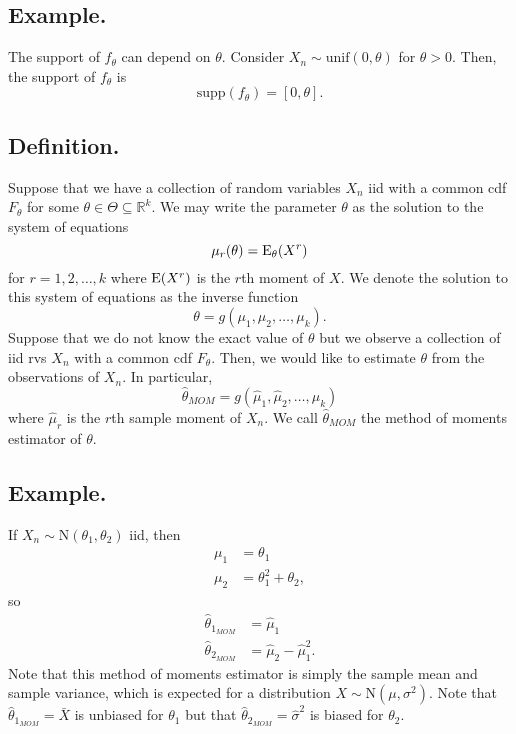 \documentclass[titlepage]{article}
\begin{document}
\subsection{Example.} The support of $f_{\theta}$ can depend on $\theta$. Consider $X_{n} \sim \text{unif}(0, \theta)$ for $\theta > 0$. Then, the support of $f_{\theta}$ is
$$\text{supp}(f_{\theta}) = [0, \theta].$$

\subsection{Definition.} Suppose that we have a collection of random variables $X_{n}$ iid with a common cdf $F_{\theta}$ for some $\theta \in \Theta \subseteq \mathbb{R}^{k}$. We may write the parameter $\theta$ as the solution to the system of equations 
$$\mu_{r}(\theta) = \text{E}_{\theta}(X^{r})$$
for $r = 1, 2, \ldots, k$ where $\text{E}(X^{r})$ is the $r$th moment of $X$. We denote the solution to this system of equations as the inverse function 
$$\theta = g(\mu_{1}, \mu_{2}, \ldots, \mu_{k}).$$
Suppose that we do not know the exact value of $\theta$ but we observe a collection of iid rvs $X_{n}$ with a common cdf $F_{\theta}$. Then, we would like to estimate $\theta$ from the observations of $X_{n}$. In particular, 
$$\hat{\theta}_{MOM} = g(\hat{\mu}_{1}, \hat{\mu}_{2}, \ldots, \hat{\mu}_{k})$$
where $\hat{\mu}_{r}$ is the $r$th sample moment of $X_{n}$. We call $\hat{\theta}_{MOM}$ the method of moments estimator of $\theta$.

\subsection{Example.} If $X_{n} \sim \text{N}(\theta_{1}, \theta_{2})$ iid, then 
\begin{align*}
    \mu_{1} &= \theta_{1} \\
    \mu_{2} &= \theta_{1}^{2} + \theta_{2},
\end{align*}
so 
\begin{align*}
    \hat{\theta}_{1_{MOM}} &= \hat{\mu}_{1} \\
    \hat{\theta}_{2_{MOM}} &= \hat{\mu}_{2} - \hat{\mu}_{1}^{2}.
\end{align*}
Note that this method of moments estimator is simply the sample mean and sample variance, which is expected for a distribution $X \sim \text{N}(\mu, \sigma^{2})$. Note that $\hat{\theta}_{1_{MOM}} = \bar{X}$ is unbiased for $\theta_{1}$ but that $\hat{\theta}_{2_{MOM}} = \hat{\sigma}^{2}$ is biased for $\theta_{2}$.
\end{document}
